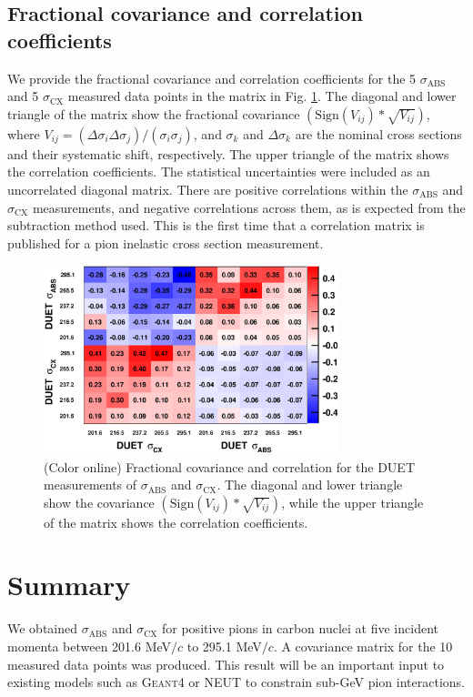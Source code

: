 \subsection{Fractional covariance and correlation coefficients}
We provide the fractional covariance and correlation coefficients for the 5 $\sigma_{\mathrm{ABS}}$ and 5 $\sigma_{\mathrm{CX}}$ measured data points in the matrix in Fig. \ref{fig:covariance}. The diagonal and lower triangle of the matrix show the fractional covariance $(\mathrm{Sign}(V_{ij})*\sqrt{V_{ij}})$, where $V_{ij} = (\Delta\sigma_{i}\Delta\sigma_{j})/(\sigma_{i}\sigma_{j})$, and $\sigma_{k}$ and $\Delta\sigma_{k}$ are the nominal cross sections and their systematic shift, respectively. The upper triangle of the matrix shows the correlation coefficients.
The statistical uncertainties were included as an uncorrelated diagonal matrix. There are positive correlations within the $\sigma_{\mathrm{ABS}}$ and $\sigma_{\mathrm{CX}}$ measurements, and negative correlations across them, as is expected from the subtraction method used. This is the first time that a correlation matrix is published for a pion inelastic cross section measurement.

\begin{figure}[h]
\begin{center}
\includegraphics[width=86mm]{figures/duet_fractional_covariance_forpaper_v4.eps}
\caption{(Color online) Fractional covariance and correlation for the DUET measurements of $\sigma_{\mathrm{ABS}}$ and $\sigma_{\mathrm{CX}}$. The  diagonal and lower triangle show the covariance $(\mathrm{Sign}(V_{ij})*\sqrt{V_{ij}})$, while the upper triangle of the matrix shows the correlation coefficients.}
\label{fig:covariance}
\end{center} 
\end{figure}

\section{Summary}
We obtained $\sigma_{\mathrm{ABS}}$ and $\sigma_{\mathrm{CX}}$ for positive pions in carbon nuclei at five incident momenta between 201.6 MeV$/c$ to 295.1 MeV$/c$. A covariance matrix for the 10 measured data points was produced. This result will be an important input to existing models such as \textsc{Geant4} or \textsc{NEUT} to constrain sub-GeV pion interactions.
